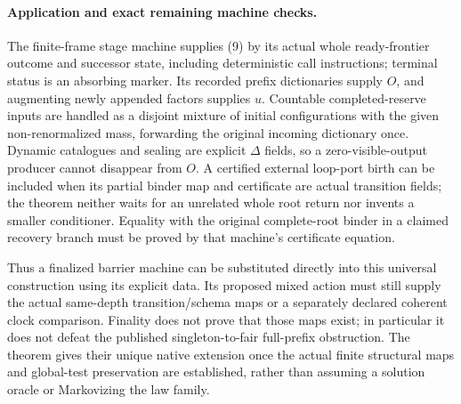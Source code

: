\documentclass[11pt]{article}
\begin{document}
\paragraph{Application and exact remaining machine checks.}
The finite-frame stage machine supplies (9) by its actual whole ready-frontier outcome and successor state, including deterministic call instructions; terminal status is an absorbing marker. Its recorded prefix dictionaries supply $O$, and augmenting newly appended factors supplies $u$. Countable completed-reserve inputs are handled as a disjoint mixture of initial configurations with the given non-renormalized mass, forwarding the original incoming dictionary once. Dynamic catalogues and sealing are explicit $\Delta$ fields, so a zero-visible-output producer cannot disappear from $O$. A certified external loop-port birth can be included when its partial binder map and certificate are actual transition fields; the theorem neither waits for an unrelated whole root return nor invents a smaller conditioner. Equality with the original complete-root binder in a claimed recovery branch must be proved by that machine's certificate equation.

Thus a finalized barrier machine can be substituted directly into this universal construction using its explicit data. Its proposed mixed action must still supply the actual same-depth transition/schema maps or a separately declared coherent clock comparison. Finality does not prove that those maps exist; in particular it does not defeat the published singleton-to-fair full-prefix obstruction. The theorem gives their unique native extension once the actual finite structural maps and global-test preservation are established, rather than assuming a solution oracle or Markovizing the law family.
\end{document}
